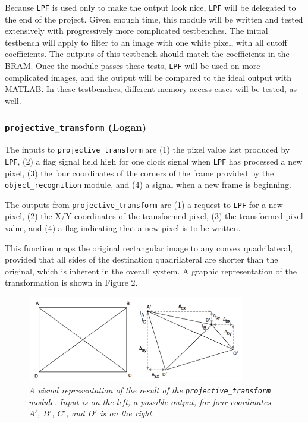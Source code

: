 \documentclass[10pt]{article}
\begin{document}
Because {\tt LPF} is used only to make the output look nice, {\tt LPF} will be delegated to the end of the project. Given enough time, this module will be written and tested extensively with progressively more complicated testbenches. The initial testbench will apply to filter to an image with one white pixel, with all cutoff coefficients. The outputs of this testbench should match the coefficients in the BRAM. Once the module passes these tests, {\tt LPF} will be used on more complicated images, and the output will be compared to the ideal output with MATLAB. In these testbenches, different memory access cases will be tested, as well.

\subsubsection{{\tt projective\_transform} (Logan)}
The inputs to {\tt projective\_transform} are (1) the pixel value last produced by {\tt LPF}, (2) a flag signal held high for one clock signal when {\tt LPF} has processed a new pixel, (3) the four coordinates of the corners of the frame provided by the {\tt object\_recognition} module, and (4) a signal when a new frame is beginning.

The outputs from {\tt projective\_transform} are (1) a request to {\tt LPF} for a new pixel, (2) the X/Y coordinates of the transformed pixel, (3) the transformed pixel value, and (4) a flag indicating that a new pixel is to be written.

This function maps the original rectangular image to any convex quadrilateral, provided that all sides of the destination quadrilateral are shorter than the original, which is inherent in the overall system. A graphic representation of the transformation is shown in Figure 2.

\begin{figure}[h!]
\centering
\includegraphics[width=0.85\textwidth]{images/arbiskew_graphic.png}
\caption{\emph{A visual representation of the result of the {\tt projective\_transform} module. Input is on the left, a possible output, for four coordinates $A\prime$, $B\prime$, $C\prime$, and $D\prime$ is on the right.}}
\end{figure}
\end{document}
